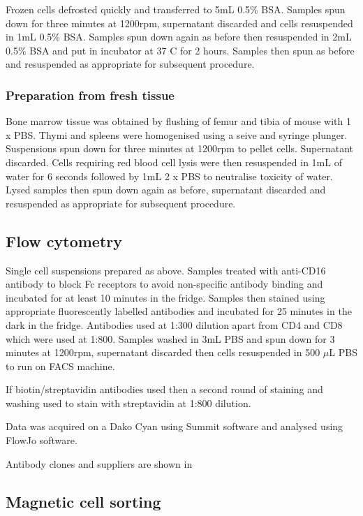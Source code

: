 Frozen cells defrosted quickly and transferred to 5mL 0.5\% BSA.
Samples spun down for three minutes at 1200rpm, supernatant discarded and cells resuspended in 1mL 0.5\% BSA.
Samples spun down again as before then resuspended in 2mL 0.5\% BSA and put in incubator at 37 \textdegree C for 2 hours.
Samples then spun as before and resuspended as appropriate for subsequent procedure.

\subsubsection{Preparation from fresh tissue}
Bone marrow tissue was obtained by flushing of femur and tibia of mouse with 1 x PBS.
Thymi and spleens were homogenised using a seive and syringe plunger.
Suspensions spun down for three minutes at 1200rpm to pellet cells.
Supernatant discarded.
Cells requiring red blood cell lysis were then resuspended in 1mL of water for 6 seconds followed by 1mL 2 x PBS to neutralise toxicity of water.
Lysed samples then spun down again as before, supernatant discarded and resuspended as appropriate for subsequent procedure.

\subsection{Flow cytometry}

Single cell suspensions prepared as above.
Samples treated with anti-CD16 antibody to block Fc receptors to avoid non-specific antibody binding and incubated for at least 10 minutes in the fridge.
Samples then stained using appropriate fluorescently labelled antibodies and incubated for 25 minutes in the dark in the fridge.
Antibodies used at 1:300 dilution apart from CD4 and CD8 which were used at 1:800. 
Samples washed in 3mL PBS and spun down for 3 minutes at 1200rpm, supernatant discarded then cells resuspended in 500 $\mu$L PBS to run on FACS machine.

If biotin/streptavidin antibodies used then a second round of staining and washing used to stain with streptavidin at 1:800 dilution.

Data was acquired on a Dako Cyan using Summit software and analysed using FlowJo software.

Antibody clones and suppliers are shown in 

\subsection{Magnetic cell sorting}
\label{Methods:MACSdepletion}


